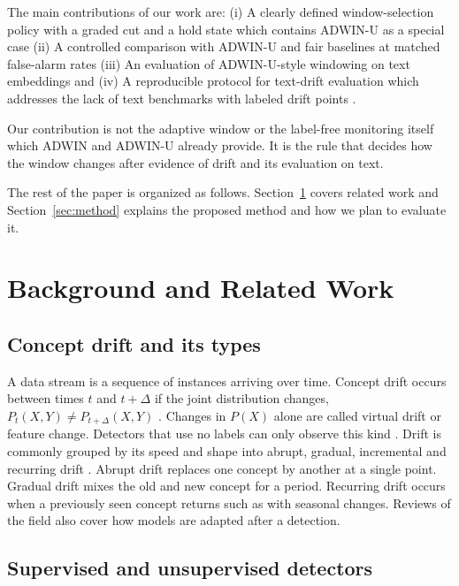 \documentclass[conference]{IEEEtran}
\begin{document}
The main contributions of our work are:
(i) A clearly defined window-selection policy with a graded cut and a hold state which contains ADWIN-U as a special case
(ii) A controlled comparison with ADWIN-U and fair baselines at matched false-alarm rates
(iii) An evaluation of ADWIN-U-style windowing on text embeddings and
(iv) A reproducible protocol for text-drift evaluation which addresses the lack of text benchmarks with labeled drift points \cite{garcia2024review}.

Our contribution is not the adaptive window or the label-free monitoring itself which ADWIN and ADWIN-U already provide. It is the rule that decides how the window changes after evidence of drift and its evaluation on text.

The rest of the paper is organized as follows. Section~\ref{sec:related} covers related work and Section~\ref{sec:method} explains the proposed method and how we plan to evaluate it.

\section{Background and Related Work}
\label{sec:related}

\subsection{Concept drift and its types}

A data stream is a sequence of instances arriving over time. Concept drift occurs between times $t$ and $t+\Delta$ if the joint distribution changes, $P_t(X,Y)\neq P_{t+\Delta}(X,Y)$ \cite{gama2014}. Changes in $P(X)$ alone are called virtual drift or feature change. Detectors that use no labels can only observe this kind \cite{assis2025}. Drift is commonly grouped by its speed and shape into abrupt, gradual, incremental and recurring drift \cite{webb2016,suarez2023}. Abrupt drift replaces one concept by another at a single point. Gradual drift mixes the old and new concept for a period. Recurring drift occurs when a previously seen concept returns such as with seasonal changes. Reviews of the field \cite{gama2014,lu2019} also cover how models are adapted after a detection.

\subsection{Supervised and unsupervised detectors}
\end{document}
